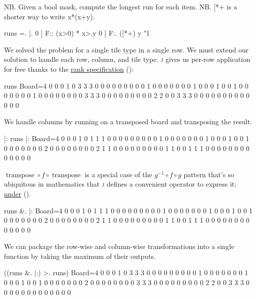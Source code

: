 \documentclass{article}
\begin{document}
\begin{code}[j]
   NB. Given a bool mask, compute the longest run for each item.
   NB. [*+ is a shorter way to write {{x*(x+y)}}.

   runs =. {{ |. 0 ] F:: {{ (x>0) * x>.y }} 0 ] F:. ([*+) y }}"1
\end{code}

We solved the problem for a single tile type in a single row.
We must extend our solution to handle each row, column, and tile type.
\textsc{j} gives us per-row application for free thanks to the  \href{https://code.jsoftware.com/wiki/Vocabulary/quote}{rank specification} ():

\begin{code}[j]
   runs Board=4
0 0 0 1 0 3 3 3 0
0 0 0 0 0 0 0 0 1
0 0 0 0 0 0 0 1 0
0 0 1 0 0 1 0 0 0
0 0 0 0 1 0 0 0 0
0 0 0 0 3 3 3 0 0
0 0 0 0 0 0 0 2 2
0 0 3 3 3 0 0 0 0
0 0 0 0 0 0 0 0 0
\end{code}

We handle columns by running  on a transposed board and transposing the result.

\begin{code}[j]
   |: runs |: Board=4
0 0 0 1 0 1 1 1 0
0 0 0 0 0 0 0 0 1
0 0 0 0 0 0 0 1 0
0 0 1 0 0 1 0 0 0
0 0 0 0 2 0 0 0 0
0 0 0 0 2 1 1 0 0
0 0 0 0 0 0 0 1 1
0 0 1 1 1 0 0 0 0
0 0 0 0 0 0 0 0 0
\end{code}

$\operatorname{transpose} \circ f \circ \operatorname{transpose}$ is a special case of the $g^{-1} \circ f \circ g$ pattern
that's so ubiquitous in mathematics that \textsc{j} defines a convenient operator to express it: \href{https://code.jsoftware.com/wiki/Vocabulary/ampdot}{under} ().

\begin{code}[j]
   runs &. |: Board=4
0 0 0 1 0 1 1 1 0
0 0 0 0 0 0 0 0 1
0 0 0 0 0 0 0 1 0
0 0 1 0 0 1 0 0 0
0 0 0 0 2 0 0 0 0
0 0 0 0 2 1 1 0 0
0 0 0 0 0 0 0 1 1
0 0 1 1 1 0 0 0 0
0 0 0 0 0 0 0 0 0
\end{code}

We can package the row-wise and column-wise transformations into a single function by taking the maximum of their outputs.

\begin{code}[j]
   ((runs &. |:) >. runs) Board=4
0 0 0 1 0 3 3 3 0
0 0 0 0 0 0 0 0 1
0 0 0 0 0 0 0 1 0
0 0 1 0 0 1 0 0 0
0 0 0 0 2 0 0 0 0
0 0 0 0 3 3 3 0 0
0 0 0 0 0 0 0 2 2
0 0 3 3 3 0 0 0 0
0 0 0 0 0 0 0 0 0
\end{code}
\end{document}
